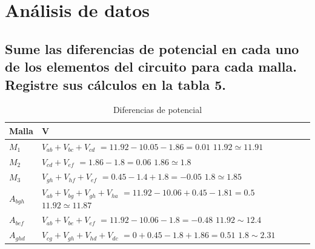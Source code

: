 \documentclass[twocolumn, 12pt]{article}
\begin{document}
\section{Análisis de datos}

\subsection{Sume las diferencias de potencial en cada uno de los elementos del circuito para cada
    malla. Registre sus cálculos en la tabla 5.}

\begin{table}[H]
    \captionsetup{justification=centering}
    \centering

    \begin{tabularx}{\linewidth}{|>{\centering\arraybackslash}X|>{\centering\arraybackslash}X|}
        \hline

        \textbf{Malla} & \textbf{V} \\\hline

        $M_1$          &
        {\scriptsize $V_{ab} + V_{bc} + V_{cd}$} $= 11.92 - 10.05 - 1.86 = 0.01$ \linebreak
        $11.92 \simeq 11.91$        \\ \hline

        $M_2$          &
        {\scriptsize $V_{cd} + V_{ef}$} $= 1.86 - 1.8 = 0.06$ \linebreak
        $1.86 \simeq 1.8$           \\\hline

        $M_3$          &
        {\scriptsize $V_{gh} + V_{hf} + V_{ef}$} $= 0.45 - 1.4 + 1.8 = -0.05$ \linebreak
        $1.8 \simeq 1.85$           \\ \hline

        $A_{bgh}$      &
        {\scriptsize $V_{ab} + V_{bg} + V_{gh} + V_{ha}$} $= 11.92 - 10.06 + 0.45 - 1.81 = 0.5$ \linebreak
        $11.92 \simeq 11.87$        \\\hline

        $A_{bef}$      &
        {\scriptsize $V_{ab} + V_{be} + V_{ef}$} $= 11.92 - 10.06 - 1.8 = -0.48$ \linebreak
        $11.92 \sim 12.4$           \\\hline

        $A_{ghd}$      &
        {\scriptsize $V_{cg} + V_{gh} + V_{hd} + V_{dc}$} $= 0 + 0.45 - 1.8 + 1.86 = 0.51$ \linebreak
        $1.8 \sim 2.31$             \\\hline
    \end{tabularx}

    \caption{Diferencias de potencial}

    \label{tab:analisisDatos__1}
\end{table}
\end{document}
